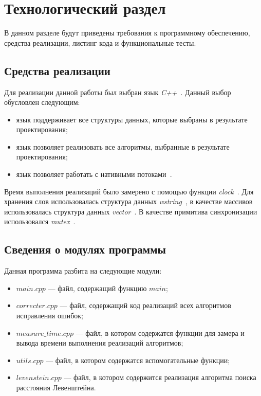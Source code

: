 \chapter{Технологический раздел}

В данном разделе будут приведены требования к программному обеспечению, средства реализации, листинг кода и функциональные тесты.


\section{Средства реализации}

Для реализации данной работы был выбран язык \textit{C++}~\cite{cpp}.
Данный выбор обусловлен следующим:
\begin{itemize}
	\item язык поддерживает все структуры данных, которые выбраны в результате проектирования;
	\item язык позволяет реализовать все алгоритмы, выбранные в результате проектирования;
	\item язык позволяет работать с нативными потоками~\cite{thread}. 
\end{itemize}

Время выполнения реализаций было замерено с помощью функции \textit{clock}~\cite{clock}. 
Для хранения слов использовалась структура данных \textit{wstring}~\cite{wstring}, в качестве массивов использовалась структура данных \textit{vector}~\cite{vector}.
В качестве примитива синхронизации использовался \textit{mutex}~\cite{mutex}.

\section{Сведения о модулях программы}

Данная программа разбита на следующие модули:
\begin{itemize}
	\item $main.cpp$ --- файл, содержащий функцию $main$;
	\item $correcter.cpp$ --- файл, содержащий код реализаций всех алгоритмов исправления ошибок;
	\item $measure\_time.cpp$ --- файл, в котором содержатся функции для замера и вывода времени выполнения реализаций алгоритмов;
	\item $utils.cpp$ --- файл, в котором содержатся вспомогательные функции;
	\item $levenstein.cpp$ --- файл, в котором содержится реализация алгоритма поиска расстояния Левенштейна.
\end{itemize}

